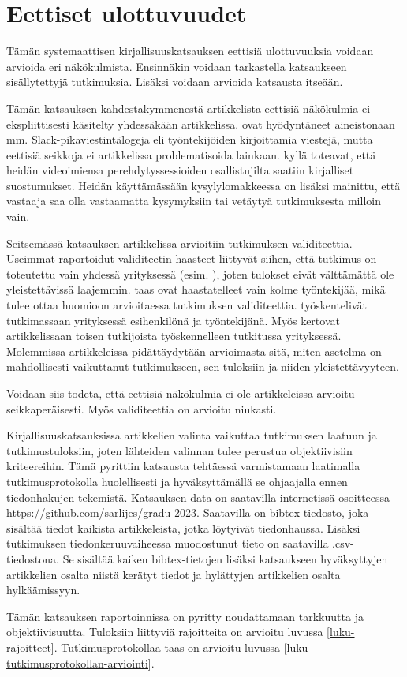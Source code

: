 \documentclass[utf8]{gradu3}
\begin{document}
\section{Eettiset ulottuvuudet}

Tämän systemaattisen kirjallisuuskatsauksen eettisiä ulottuvuuksia voidaan arvioida eri näkökulmista. Ensinnäkin voidaan tarkastella katsaukseen sisällytettyjä tutkimuksia. Lisäksi voidaan arvioida katsausta itseään.

Tämän katsauksen kahdestakymmenestä artikkelista eettisiä näkökulmia ei ekspliittisesti käsitelty yhdessäkään artikkelissa. \textcite{moe-ym-2020} ovat hyödyntäneet aineistonaan mm. Slack-pikaviestintälogeja eli työntekijöiden kirjoittamia viestejä, mutta eettisiä seikkoja ei artikkelissa problematisoida lainkaan. \textcite{yates-ym-2020} kyllä toteavat, että heidän videoimiensa perehdytyssessioiden osallistujilta saatiin kirjalliset suostumukset. Heidän käyttämässään kysylylomakkeessa on lisäksi mainittu, että vastaaja saa olla vastaamatta kysymyksiin tai vetäytyä tutkimuksesta milloin vain. 

Seitsemässä katsauksen artikkelissa arvioitiin tutkimuksen validiteettia. Useimmat raportoidut validiteetin haasteet liittyvät siihen, että tutkimus on toteutettu vain yhdessä yrityksessä (esim. \textcite{johnson-senges-2010}), joten tulokset eivät välttämättä ole yleistettävissä laajemmin. \textcite{viana-ym-2014} taas ovat haastatelleet vain kolme työntekijää, mikä tulee ottaa huomioon arvioitaessa tutkimuksen validiteettia. \textcite{hemphill-begel-2011} työskentelivät tutkimassaan yrityksessä esihenkilönä ja työntekijänä. Myös \textcite{kumar-wallace-2019} kertovat artikkelissaan toisen tutkijoista työskennelleen tutkitussa yrityksessä. Molemmissa artikkeleissa pidättäydytään arvioimasta sitä, miten asetelma on mahdollisesti vaikuttanut tutkimukseen, sen tuloksiin ja niiden yleistettävyyteen.

Voidaan siis todeta, että eettisiä näkökulmia ei ole artikkeleissa arvioitu seikkaperäisesti. Myös validiteettia on arvioitu niukasti.

Kirjallisuuskatsauksissa artikkelien valinta vaikuttaa tutkimuksen laatuun ja tutkimustuloksiin, joten lähteiden valinnan tulee perustua objektiivisiin kriteereihin. Tämä pyrittiin katsausta tehtäessä varmistamaan laatimalla tutkimusprotokolla huolellisesti ja hyväksyttämällä se ohjaajalla ennen tiedonhakujen tekemistä. Katsauksen data on saatavilla internetissä osoitteessa 
 \href{https://github.com/sarlijes/gradu-2023}{https://github.com/sarlijes/gradu-2023}. Saatavilla on bibtex-tiedosto, joka sisältää tiedot kaikista artikkeleista, jotka löytyivät tiedonhaussa. Lisäksi tutkimuksen tiedonkeruuvaiheessa muodostunut tieto on saatavilla .csv-tiedostona. Se sisältää kaiken bibtex-tietojen lisäksi katsaukseen hyväksyttyjen artikkelien osalta niistä kerätyt tiedot ja hylättyjen artikkelien osalta hylkäämissyyn. 

Tämän katsauksen raportoinnissa on pyritty noudattamaan tarkkuutta ja objektiivisuutta. Tuloksiin liittyviä rajoitteita on arvioitu luvussa \ref{luku-rajoitteet}. Tutkimusprotokollaa taas on arvioitu luvussa \ref{luku-tutkimusprotokollan-arviointi}.


\printbibliography
\end{document}

